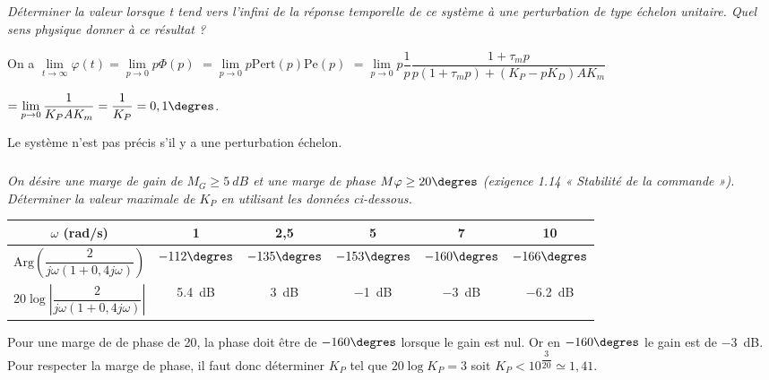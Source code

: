 \documentclass[10pt,fleqn]{article} %
\begin{document}
\begin{multicols}{2}
\begin{corrige}
\end{corrige}
\else
\fi



\subparagraph{}
\textit{Déterminer la valeur lorsque t tend vers l’infini de la réponse temporelle de ce système à une
perturbation de type échelon unitaire. Quel sens physique donner à ce résultat ?}
\ifprof
\begin{corrige}
On a $\lim\limits_{t\to\infty}\varphi(t) = \lim\limits_{p\to 0}p\Phi(p)$ 
$=\lim\limits_{p\to 0}p\text{Pert}(p)\text{Pe}(p)$
  $= \lim\limits_{p\to 0}p\dfrac{1}{p} \dfrac{1+\tau_m p}{p \left(1+\tau_m p\right)+\left(K_P-pK_D\right)AK_m}$
  
  $= \lim\limits_{p\to 0}\dfrac{1}{K_PAK_m} =\dfrac{1}{K_P}=0,1\degres$.
  
Le système n'est pas précis s'il y a une perturbation échelon. 
\end{corrige}
\else
\fi

\subparagraph{}
\textit{On désire une marge de gain de $M_G \geq \SI{5}{dB}$ et une marge de phase $M\varphi \geq 20\degres$ (exigence 1.14 « Stabilité de la commande »). Déterminer la valeur maximale de $K_P$ en utilisant les données ci-dessous.}

\footnotesize
\begin{center}
\begin{tabular}{|c|c|c|c|c|c|}
\hline
$\omega$ (rad/s) & 1 & 2,5 & 5 & 7 & 10 \\ \hline
$\text{Arg}\left( \dfrac{2}{j\omega \left(1+0,4 j\omega \right)}\right)$  & $-112\degres$ & $-135\degres$ & $-153\degres$ & $-160\degres$ & $-166\degres$ \\ \hline
$20 \log \left| \dfrac{2}{j\omega \left(1+0,4 j\omega \right)}\right|$ & \SI{5,4}{dB} & \SI{3}{dB} & \SI{-1}{dB} & \SI{-3}{dB} & \SI{-6,2}{dB} \\ \hline
\end{tabular}
\end{center}
\normalsize

\ifprof
\begin{corrige}
Pour une marge  de de phase de 20\degres, la phase doit être de $-160\degres$ lorsque le gain est nul. Or en $-160\degres$ le gain est de \SI{-3}{dB}. Pour respecter la marge de phase, il faut donc déterminer $K_P$ tel que $20\log K_P = 3$ soit $K_P < 10^{\dfrac{3}{20}}\simeq1,41 $.


\end{corrige}
\end{multicols}
\end{document}
